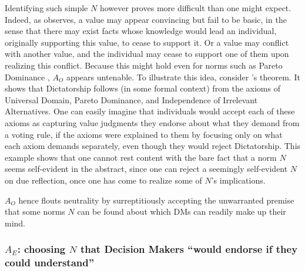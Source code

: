\documentclass[preprint, french, english, 11pt, authoryear]{elsarticle}%
\newcommand{\protectforpdf}[1]{\texorpdfstring{\ensuremath{#1}}{#1}}
\newcommand{\acp}[1]{#1s}
\begin{document}
Identifying such simple $N$ however proves more difficult than one might expect. 
Indeed, as \citet{sen_nature_1967} observes, a value may appear convincing but fail to be basic, in the sense that there may exist facts whose knowledge would lead an individual, originally supporting this value, to cease to support it. 
Or a value may conflict with another value, and the individual may cease to support one of them upon realizing this conflict.
Because this might hold even for norms such as Pareto Dominance \citep[ch. 5 and 6]{sen_collective_1984}, $A_O$ appears untenable.
To illustrate this idea, consider \citeauthor{arrow_social_2012}’s \citeyearpar{arrow_social_2012} theorem.
It shows that Dictatorship follows (in some formal context) from the axioms of Universal Domain, Pareto Dominance, and Independence of Irrelevant Alternatives.
One can easily imagine that individuals would accept each of these axioms as capturing value judgments they endorse about what they demand from a voting rule, if the axioms were explained to them by focusing only on what each axiom demands separately, even though they would reject Dictatorship.
This example shows that one cannot rest content with the bare fact that a norm $N$ seems self-evident in the abstract, since one can reject a seemingly self-evident $N$ on due reflection, once one has come to realize some of $N$'s implications.

$A_O$ hence flouts neutrality by surreptitiously accepting the unwarranted premise that 
some norms $N$ can be found about which \acp{DM} can readily make up their mind.

\subsubsection{\texorpdfstring{$A_E$}{AE}: choosing \protectforpdf{N} that Decision Makers %
 “would endorse if they could understand”}
\end{document}
